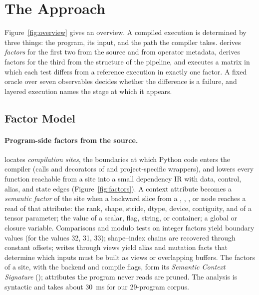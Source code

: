 \section{The \tool Approach}
\label{sec:approach}



Figure~\ref{fig:overview} gives an overview. A compiled execution is determined by three things: the program,
its input, and the path the compiler takes. \tool derives \emph{factors} for the first two from the source and
from operator metadata, derives factors for the third from the structure of the pipeline, and executes a matrix
in which each test differs from a reference execution in exactly one factor. A fixed oracle over seven
observables decides whether the difference is a failure, and layered execution names the stage at which it
appears.

\subsection{Factor Model}
\label{sec:factors}

\paragraph{Program-side factors from the source.} \tool locates \emph{compilation sites}, the boundaries at
which Python code enters the compiler (calls and decorators of \tcompile and project-specific wrappers), and
lowers every function reachable from a site into a small dependency IR with data, control, alias, and state
edges (Figure~\ref{fig:factors}). A context attribute becomes a \emph{semantic factor} of the site when a
backward slice from a , , , or  node reaches a read of
that attribute: the rank, shape, stride, dtype, device, contiguity, and  of a tensor
parameter; the value of a scalar, flag, string, or container; a global or closure variable. Comparisons and
modulo tests on integer factors yield boundary values (for  the values 32, 31, 33);
shape--index chains are recovered through constant offsets; writes through views yield alias and mutation facts
that determine which inputs must be built as views or overlapping buffers. The factors of a
site, with the backend and compile flags, form its \emph{Semantic Context Signature} (\scs); attributes the
program never reads are pruned. The analysis is syntactic and takes about 30~ms for our 29-program corpus.

